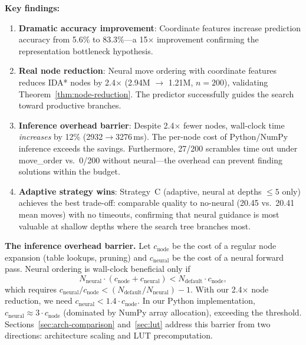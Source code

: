 \documentclass[conference]{IEEEtran}
\begin{document}
\textbf{Key findings:}
\begin{enumerate}[leftmargin=*]
  \item \textbf{Dramatic accuracy improvement}: Coordinate features increase prediction accuracy from 5.6\% to 83.3\%---a 15$\times$ improvement confirming the representation bottleneck hypothesis.
  \item \textbf{Real node reduction}: Neural move ordering with coordinate features reduces IDA* nodes by 2.4$\times$ (2.94M $\to$ 1.21M, $n{=}200$), validating Theorem~\ref{thm:node-reduction}. The predictor successfully guides the search toward productive branches.
  \item \textbf{Inference overhead barrier}: Despite 2.4$\times$ fewer nodes, wall-clock time \emph{increases} by 12\% (2932$\to$3276\,ms). The per-node cost of Python/NumPy inference exceeds the savings. Furthermore, 27/200 scrambles time out under move\_order vs.\ 0/200 without neural---the overhead can prevent finding solutions within the budget.
  \item \textbf{Adaptive strategy wins}: Strategy~C (adaptive, neural at depths $\leq 5$ only) achieves the best trade-off: comparable quality to no-neural (20.45 vs.\ 20.41 mean moves) with no timeouts, confirming that neural guidance is most valuable at shallow depths where the search tree branches most.
\end{enumerate}

\textbf{The inference overhead barrier.} Let $c_{\text{node}}$ be the cost of a regular node expansion (table lookups, pruning) and $c_{\text{neural}}$ be the cost of a neural forward pass. Neural ordering is wall-clock beneficial only if
\begin{equation}
\label{eq:overhead}
N_{\text{neural}} \cdot (c_{\text{node}} + c_{\text{neural}}) < N_{\text{default}} \cdot c_{\text{node}},
\end{equation}
which requires $c_{\text{neural}} / c_{\text{node}} < (N_{\text{default}}/N_{\text{neural}}) - 1$. With our 2.4$\times$ node reduction, we need $c_{\text{neural}} < 1.4 \cdot c_{\text{node}}$. In our Python implementation, $c_{\text{neural}} \approx 3 \cdot c_{\text{node}}$ (dominated by NumPy array allocation), exceeding the threshold. Sections~\ref{sec:arch-comparison} and~\ref{sec:lut} address this barrier from two directions: architecture scaling and LUT precomputation.
\end{document}
